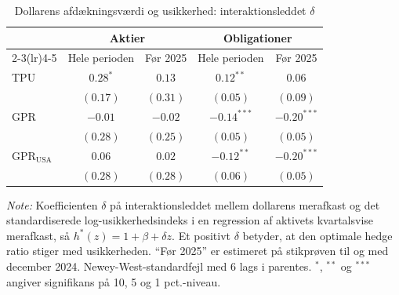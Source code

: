 \begin{table}[H]
\centering
\caption{Dollarens afdækningsværdi og usikkerhed: interaktionsleddet $\delta$}
\label{tab:campbell_betinget}
\begin{threeparttable}
\begin{tabular}{l cc cc}
\toprule
 & \multicolumn{2}{c}{Aktier} & \multicolumn{2}{c}{Obligationer} \\
\cmidrule(lr){2-3}\cmidrule(lr){4-5}
 & Hele perioden & Før 2025 & Hele perioden & Før 2025 \\
\midrule
TPU & $0.28^{*}$ & $0.13$ & $0.12^{**}$ & $0.06$ \\
 & $(0.17)$ & $(0.31)$ & $(0.05)$ & $(0.09)$ \\[2pt]
GPR & $-0.01$ & $-0.02$ & $-0.14^{***}$ & $-0.20^{***}$ \\
 & $(0.28)$ & $(0.25)$ & $(0.05)$ & $(0.05)$ \\[2pt]
$\text{GPR}_{\text{USA}}$ & $0.06$ & $0.02$ & $-0.12^{**}$ & $-0.20^{***}$ \\
 & $(0.28)$ & $(0.28)$ & $(0.06)$ & $(0.05)$ \\[2pt]
\bottomrule
\end{tabular}
\begin{tablenotes}[flushleft]\footnotesize
\item \textit{Note:} Koefficienten $\delta$ på interaktionsleddet mellem dollarens merafkast og det
standardiserede log-usikkerhedsindeks i en regression af aktivets kvartalsvise merafkast, så
$h^*(z) = 1 + \beta + \delta z$. Et positivt $\delta$ betyder, at den optimale hedge ratio stiger med
usikkerheden. ``Før 2025'' er estimeret på stikprøven til og med december 2024. Newey-West-standardfejl
med 6 lags i parentes. $^{*}$, $^{**}$ og $^{***}$ angiver signifikans på 10, 5 og 1 pct.-niveau.
\end{tablenotes}
\end{threeparttable}
\end{table}